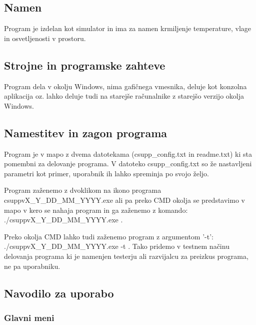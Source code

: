 \documentclass[a4paper,12pt]{article}
\begin{document}
\newpage

	\subsection{Namen}

	\quad Program je izdelan kot simulator in ima za namen krmiljenje temperature, vlage in osvetljenosti v prostoru.

	\subsection{Strojne in programske zahteve}

	\quad Program dela v okolju Windows, nima gafičnega vmesnika, deluje kot konzolna aplikacija oz. lahko deluje
	tudi na starejše računalnike z starejšo verzijo okolja Windows.

	\subsection{Namestitev in zagon programa}

	\quad Program je v mapo z dvema datotekama (csupp\_config.txt in readme.txt) ki sta pomembni za delovanje programa.
	V datoteko csupp\_config.txt so že nastavljeni parametri kot primer, uporabnik ih lahko spreminja po svojo željo.
	
	\hspace{-0.8cm} \quad Program zaženemo z dvoklikom na ikono programa csuppvX\_Y\_DD\_MM\_YYYY.exe ali pa preko CMD okolja se predstavimo
	v mapo v kero se nahaja program in ga zaženemo z komando: \\ ./csuppvX\_Y\_DD\_MM\_YYYY.exe .

	\hspace{-0.8cm} \quad Preko okolja CMD lahko tudi zaženemo program z argumentom '-t':\\ ./csuppvX\_Y\_DD\_MM\_YYYY.exe -t .
	Tako pridemo v testnem načinu delovanja programa ki je namenjen testerju ali razvijalcu za preizkus programa, ne pa uporabniku.

	\subsection{Navodilo za uporabo}

	\subsubsection{Glavni meni}
\end{document}
